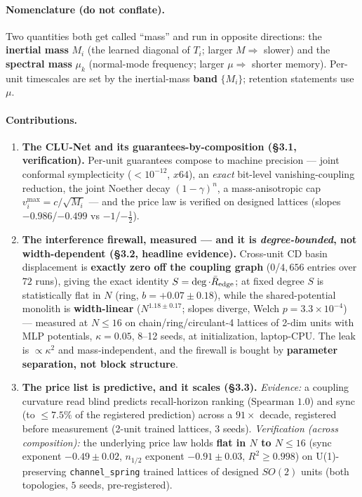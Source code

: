 \documentclass[11pt]{article}
\newcommand{\half}{\tfrac12}
\begin{document}
\paragraph{Nomenclature (do not conflate).} Two quantities both get called ``mass'' and run in opposite directions: the \textbf{inertial mass} $M_i$ (the learned diagonal of $T_i$; larger $M\Rightarrow$ slower) and the \textbf{spectral mass} $\mu_k$ (normal-mode frequency; larger $\mu\Rightarrow$ shorter memory). Per-unit timescales are set by the inertial-mass \textbf{band} $\{M_i\}$; retention statements use $\mu$.

\paragraph{Contributions.}
\begin{enumerate}\itemsep2pt
\item \textbf{The CLU-Net and its guarantees-by-composition (\S3.1, verification).} Per-unit guarantees compose to machine precision --- joint conformal symplecticity ($<10^{-12}$, $x64$), an \emph{exact} bit-level vanishing-coupling reduction, the joint Noether decay $(1-\gamma)^n$, a mass-anisotropic cap $v_i^{\max}=c/\sqrt{M_i}$ --- and the price law is verified on designed lattices (slopes $-0.986$/$-0.499$ vs $-1$/$-\half$).
\item \textbf{The interference firewall, measured --- and it is \emph{degree-bounded}, not width-dependent (\S3.2, headline evidence).} Cross-unit CD basin displacement is \textbf{exactly zero off the coupling graph} ($0$/$4{,}656$ entries over $72$ runs), giving the exact identity $S=\deg\cdot\bar R_{\rm edge}$; at fixed degree $S$ is statistically flat in $N$ (ring, $b=+0.07\pm0.18$), while the shared-potential monolith is \textbf{width-linear} ($N^{1.18\pm0.17}$; slopes diverge, Welch $p=3.3\times10^{-4}$) --- measured at $N\le16$ on chain/ring/circulant-4 lattices of 2-dim units with MLP potentials, $\kappa=0.05$, 8--12 seeds, at initialization, laptop-CPU. The leak is $\propto\kappa^2$ and mass-independent, and the firewall is bought by \textbf{parameter separation, not block structure}.
\item \textbf{The price list is predictive, and it scales (\S3.3).} \emph{Evidence:} a coupling curvature read blind predicts recall-horizon ranking (Spearman $1.0$) and sync (to $\le7.5\%$ of the registered prediction) across a $91\times$ decade, registered before measurement (2-unit trained lattices, 3 seeds). \emph{Verification (across composition):} the underlying price law holds \textbf{flat in $N$ to $N\le16$} (sync exponent $-0.49\pm0.02$, $n_{1/2}$ exponent $-0.91\pm0.03$, $R^2\ge0.998$) on U(1)-preserving \texttt{channel\_spring} trained lattices of designed $SO(2)$ units (both topologies, $5$ seeds, pre-registered).

\end{enumerate}
\end{document}
